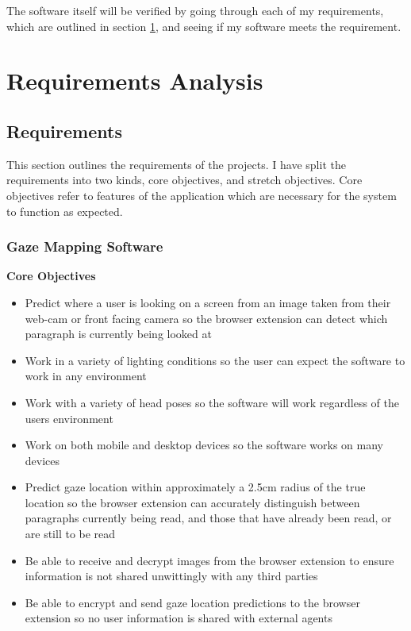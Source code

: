 \documentclass[twocolumn]{report}
\begin{document}
The software itself will be verified by going through each of my requirements, which are outlined in section \ref{sec:requirements}, and seeing if my software meets the requirement. 

\section{Requirements Analysis}\label{sec:requirements}


\subsection{Requirements}

This section outlines the requirements of the projects. I have split the requirements into two kinds, core objectives, and stretch objectives. Core objectives refer to features of the application which are necessary for the system to function as expected. 

\subsubsection{Gaze Mapping Software}

\textbf{Core Objectives}
\begin{itemize}
    \item Predict where a user is looking on a screen from an image taken from their web-cam or front facing camera so the browser extension can detect which paragraph is currently being looked at  
    \item Work in a variety of lighting conditions so the user can expect the software to work in any environment
    \item Work with a variety of head poses so the software will work regardless of the users environment 
    \item Work on both mobile and desktop devices so the software works on many devices 
    \item Predict gaze location within approximately a 2.5cm radius of the true location so the browser extension can accurately distinguish between paragraphs currently being read, and those that have already been read, or are still to be read
    \item Be able to receive and decrypt images from the browser extension to ensure information is not shared unwittingly with any third parties  
    \item Be able to encrypt and send gaze location predictions to the browser extension so no user information is shared with external agents 
\end{itemize}
\end{document}
